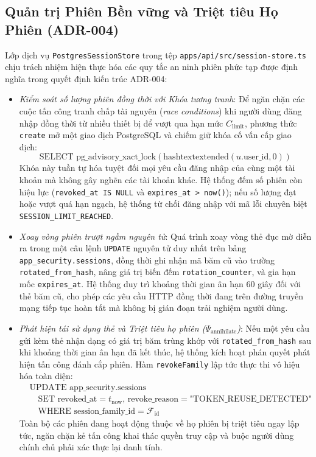 \subsection{Quản trị Phiên Bền vững và Triệt tiêu Họ Phiên (ADR-004)}
Lớp dịch vụ \texttt{PostgresSessionStore} trong tệp \texttt{apps/api/src/session-store.ts} chịu trách nhiệm hiện thực hóa các quy tắc an ninh phiên phức tạp được định nghĩa trong quyết định kiến trúc ADR-004:
\begin{itemize}
    \item[-] \textit{Kiểm soát số lượng phiên đồng thời với Khóa tương tranh}: Để ngăn chặn các cuộc tấn công tranh chấp tài nguyên (\textit{race conditions}) khi người dùng đăng nhập đồng thời từ nhiều thiết bị để vượt qua hạn mức $C_{\text{limit}}$, phương thức \texttt{create} mở một giao dịch PostgreSQL và chiếm giữ khóa cố vấn cấp giao dịch:
    \begin{equation}
    \label{eq:advisory_lock_vi}
    \text{SELECT pg\_advisory\_xact\_lock}(\text{hashtextextended}(u.\text{user\_id}, 0))
    \end{equation}
    Khóa này tuần tự hóa tuyệt đối mọi yêu cầu đăng nhập của cùng một tài khoản mà không gây nghẽn các tài khoản khác. Hệ thống đếm số phiên còn hiệu lực (\texttt{revoked\_at IS NULL} và \texttt{expires\_at > now()}); nếu số lượng đạt hoặc vượt quá hạn ngạch, hệ thống từ chối đăng nhập với mã lỗi chuyên biệt \texttt{SESSION\_LIMIT\_REACHED}.
    \item[-] \textit{Xoay vòng phiên trượt ngầm nguyên tử}: Quá trình xoay vòng thẻ đục mờ diễn ra trong một câu lệnh \texttt{UPDATE} nguyên tử duy nhất trên bảng \texttt{app\_security.sessions}, đồng thời ghi nhận mã băm cũ vào trường \texttt{rotated\_from\_hash}, nâng giá trị biến đếm \texttt{rotation\_counter}, và gia hạn mốc \texttt{expires\_at}. Hệ thống duy trì khoảng thời gian ân hạn 60 giây đối với thẻ băm cũ, cho phép các yêu cầu HTTP đồng thời đang trên đường truyền mạng tiếp tục hoàn tất mà không bị gián đoạn trải nghiệm người dùng.
    \item[-] \textit{Phát hiện tái sử dụng thẻ và Triệt tiêu họ phiên ($\Psi_{\text{annihilate}}$)}: Nếu một yêu cầu gửi kèm thẻ nhận dạng có giá trị băm trùng khớp với \texttt{rotated\_from\_hash} sau khi khoảng thời gian ân hạn đã kết thúc, hệ thống kích hoạt phán quyết phát hiện tấn công đánh cắp phiên. Hàm \texttt{revokeFamily} lập tức thực thi vô hiệu hóa toàn diện:
    \begin{equation}
    \label{eq:revoke_family_vi}
    \begin{aligned}
    &\text{UPDATE app\_security.sessions} \\
    &\quad \text{SET revoked\_at} = t_{\text{now}}, \, \text{revoke\_reason} = \text{"TOKEN\_REUSE\_DETECTED"} \\
    &\quad \text{WHERE session\_family\_id} = \mathcal{F}_{\text{id}}
    \end{aligned}
    \end{equation}
    Toàn bộ các phiên đang hoạt động thuộc về họ phiên bị triệt tiêu ngay lập tức, ngăn chặn kẻ tấn công khai thác quyền truy cập và buộc người dùng chính chủ phải xác thực lại danh tính.
\end{itemize}

